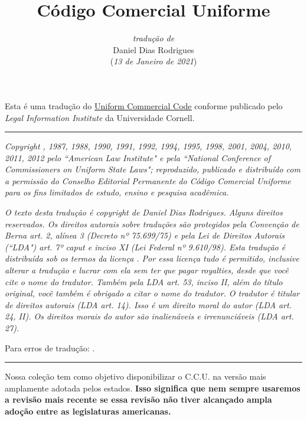 \documentclass[a4paper, 12pt]{article}
\title{\textbf{Código Comercial Uniforme}}
\author{\textit{tradução de}\\Daniel Dias Rodrigues\\ (\textit{13 de Janeiro de 2021})}
\date{}
\begin{document}
\maketitle

Esta é uma tradução do \href{https://www.law.cornell.edu/ucc}{\underline{Uniform Commercial Code}} conforme publicado pelo \textit{Legal Information Institute} da Universidade Cornell.

\begin{center}
\rule{7cm}{0.4pt}
\end{center}

\textit{Copyright , 1987, 1988, 1990, 1991, 1992, 1994, 1995, 1998, 2001, 2004, 2010, 2011, 2012 pelo ``American Law Institute" e pela ``National Conference of Commissioners on Uniform State Laws"; reproduzido, publicado e distribuído com a permissão do Conselho Editorial Permanente do Código Comercial Uniforme para os fins limitados de estudo, ensino e pesquisa acadêmica.}

\vspace{5mm}

\textit{O texto desta tradução é copyright  de Daniel Dias Rodrigues. Alguns direitos reservados. Os direitos autorais sobre traduções são protegidos pela Convenção de Berna art. 2, alínea 3 (Decreto nº 75.699/75) e pela Lei de Direitos Autorais (``LDA") art. 7º caput e inciso XI (Lei Federal nº 9.610/98). Esta tradução é distribuída sob os termos da licença \href{https://creativecommons.org/licenses/by/4.0/deed.pt_BR}{\underline{}}. Por essa licença tudo é permitido, inclusive alterar a tradução e lucrar com ela sem ter que pagar royalties, desde que você cite o nome do tradutor. Também pela LDA art. 53, inciso II, além do título original, você também é obrigado a citar o nome do tradutor. O tradutor é titular de direitos autorais (LDA art. 14). Isso é um direito moral do autor (LDA art. 24, II). Os direitos morais do autor são inalienáveis e irrenunciáveis (LDA art. 27).}

\vspace{5mm}

Para erros de tradução: \href{mailto:danieldiasr@gmail.com}{\underline{}}.

\begin{center}
\rule{7cm}{0.4pt}
\end{center}

Nossa coleção tem como objetivo disponibilizar o C.C.U. na versão mais amplamente adotada pelos estados. \textbf{Isso significa que nem sempre usaremos a revisão mais recente se essa revisão não tiver alcançado ampla adoção entre as legislaturas americanas.}
\end{document}
